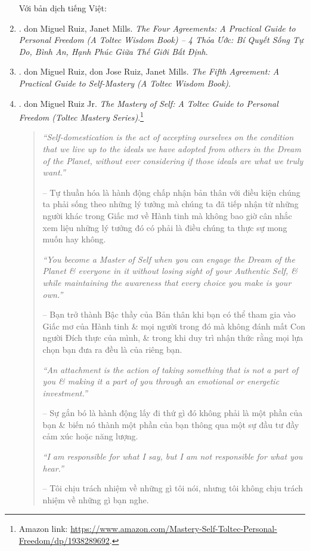 \documentclass[12pt]{article}
\begin{document}
\begin{enumerate}
	Với bản dịch tiếng Việt:
	\item \cite{Ruiz_Mills_4_agreements_VN}. {\sc don Miguel Ruiz, Janet Mills}. {\it The Four Agreements: A Practical Guide to Personal Freedom (A Toltec Wisdom Book) -- 4 Thỏa Ước: Bí Quyết Sống Tự Do, Bình An, Hạnh Phúc Giữa Thế Giới Bất Định}.
	\item \cite{Ruiz_Ruiz_5th_agreement}. {\sc don Miguel Ruiz, don Jose Ruiz, Janet Mills}. {\it The Fifth Agreement: A Practical Guide to Self-Mastery (A Toltec Wisdom Book)}.
	\item \cite{Ruiz_mastery_self}. {\sc don Miguel Ruiz Jr.} {\it The Mastery of Self: A Toltec Guide to Personal Freedom (Toltec Mastery Series)}.\footnote{Amazon link: \url{https://www.amazon.com/Mastery-Self-Toltec-Personal-Freedom/dp/1938289692}.}
	\begin{quotation}
		{\it``Self-domestication is the act of accepting ourselves on the condition that we live up to the ideals we have adopted from others in the Dream of the Planet, without ever considering if those ideals are what we truly want.''}
		
		-- Tự thuần hóa là hành động chấp nhận bản thân với điều kiện chúng ta phải sống theo những lý tưởng mà chúng ta đã tiếp nhận từ những người khác trong Giấc mơ về Hành tinh mà không bao giờ cân nhắc xem liệu những lý tưởng đó có phải là điều chúng ta thực sự mong muốn hay không.
				
		{\it``You become a Master of Self when you can engage the Dream of the Planet \& everyone in it without losing sight of your Authentic Self, \& while maintaining the awareness that every choice you make is your own.''}
		
		-- Bạn trở thành Bậc thầy của Bản thân khi bạn có thể tham gia vào Giấc mơ của Hành tinh \& mọi người trong đó mà không đánh mất Con người Đích thực của mình, \& trong khi duy trì nhận thức rằng mọi lựa chọn bạn đưa ra đều là của riêng bạn.
		
		{\it``An attachment is the action of taking something that is not a part of you \& making it a part of you through an emotional or energetic investment.''}
		
		-- Sự gắn bó là hành động lấy đi thứ gì đó không phải là một phần của bạn \& biến nó thành một phần của bạn thông qua một sự đầu tư đầy cảm xúc hoặc năng lượng.
		
		{\it``I am responsible for what I say, but I am not responsible for what you hear.''}
		
		-- Tôi chịu trách nhiệm về những gì tôi nói, nhưng tôi không chịu trách nhiệm về những gì bạn nghe.
		

\end{quotation}
\end{enumerate}
\end{document}
